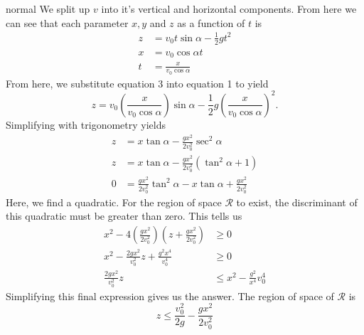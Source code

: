 \begin{solution}{normal}
We split up $v$ into it's vertical and horizontal components. From here we can see that each parameter $x, y$ and $z$ as a function of $t$ is 
\begin{align}
z &= v_0t\sin\alpha - \frac{1}{2}gt^2\\
x &= v_0\cos\alpha t\\
t &= \frac{x}{v_0\cos\alpha}
\end{align}
From here, we substitute equation 3 into equation 1 to yield 
\[z = v_0\left(\frac{x}{v_0\cos\alpha}\right)\sin\alpha - \frac{1}{2}g\left(\frac{x}{v_0\cos\alpha}\right)^2.\]
Simplifying with trigonometry yields 
\begin{align*}
z &= x\tan\alpha - \frac{gx^2}{2v_0^2}\sec^2\alpha\\
z &= x\tan\alpha - \frac{gx^2}{2v_0^2}(\tan^2\alpha + 1)\\
0&=\frac{gx^2}{2v_0^2}\tan^2\alpha - x\tan\alpha + \frac{gx^2}{2v_0^2}
\end{align*}
Here, we find a quadratic. For the region of space $\mathcal{R}$ to exist, the discriminant of this quadratic must be greater than zero. This tells us 
\begin{align*}
x^2 - 4\left(\frac{gx^2}{2v_0^2}\right)\left(z + \frac{gx^2}{2v_0^2}\right)&\geq 0\\
x^2 - \frac{2gx^2}{v_0^2}z + \frac{g^2 x^4}{v_0^4} &\geq 0\\
\frac{2gx^2}{v_0^2}z &\leq x^2 - \frac{g^2}{x^4}{v_0^4}
\end{align*}
Simplifying this final expression gives us the answer. The region of space of $\mathcal{R}$ is 
\[\boxed{z\leq \frac{v_0^2}{2g} - \frac{gx^2}{2v_0^2}}\]
\end{solution}